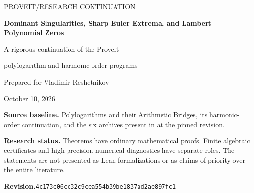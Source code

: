 \documentclass[11pt]{article}
\numberwithin{equation}{section}
\theoremstyle{definition}
\theoremstyle{remark}
\newcommand{\src}[1]{\texttt{\detokenize{#1}}}
\begin{document}
\hypersetup{pageanchor=false}
\begin{titlepage}
\vspace*{1cm}
{\large\color{Teal} PROVEIT\quad /\quad RESEARCH CONTINUATION\par}
\vspace{1.0cm}
{\huge\bfseries\color{Ink} Dominant Singularities, Sharp Euler Extrema, and Lambert Polynomial Zeros\par}
\vspace{0.7cm}
{\Large A rigorous continuation of the ProveIt\par
polylogarithm and harmonic-order programs\par}
\vspace{1cm}
{\large Prepared for Vladimir Reshetnikov\par}
\vspace{0.3cm}
{\large October 10, 2026\par}
\vfill
\noindent\textbf{Source baseline.}\quad
\href{https://github.com/VladimirReshetnikov/ProveIt/tree/4c173c06cc32c9cea554b39be1837ad2ae897fc1/Analysis/Polylogarithms/docs/manuscript}{Polylogarithms and their Arithmetic Bridges},
its harmonic-order continuation, and the six archives present in
\src{docs/incoming} at the pinned revision.
\par\medskip
\noindent\textbf{Research status.}\quad
Theorems have ordinary mathematical proofs. Finite algebraic certificates
and high-precision numerical diagnostics have separate roles.
The statements are not presented as Lean formalizations or as claims of
priority over the entire literature.
\par\medskip
\noindent\textbf{Revision.}\quad\texttt{4c173c06cc32c9cea554b39be1837ad2ae897fc1}
\end{titlepage}
\hypersetup{pageanchor=true}
\end{document}
